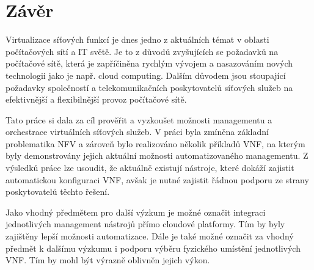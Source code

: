 \chapter{Závěr}

Virtualizace síťových funkcí je dnes jedno z aktuálních témat v oblasti počítačových sítí a IT světě. Je to z důvodů zvyšujících se požadavků na počítačové sítě, která je zapříčiněna rychlým vývojem a nasazováním nových technologii jako je např. cloud computing. Dalším důvodem jsou stoupající požadavky společností a telekomunikačních poskytovatelů síťových služeb na efektivnější a flexibilnější provoz počítačové sítě. 

Tato práce si dala za cíl prověřit a vyzkoušet možnosti managementu a orchestrace virtuálních síťových služeb. V práci byla zmíněna základní problematika NFV a zároveň bylo realizováno několik příkladů VNF, na kterým byly demonstrovány jejich aktuální možnosti automatizovaného managementu. Z výsledků práce lze usoudit, že aktuálně existují nástroje, které dokáží zajistit automatickou konfiguraci VNF, avšak je nutné zajistit řádnou podporu ze strany poskytovatelů těchto řešení.   

Jako vhodný předmětem pro další výzkum je možné označit integraci jednotlivých management nástrojů přímo cloudové platformy. Tím by byly zajištěny lepší možnosti automatizace. Dále je také možné označit za vhodný předmět k dalšímu výzkumu i podporu výběru fyzického umístění jednotlivých VNF. Tím by mohl být výrazně oblivněn jejich výkon.